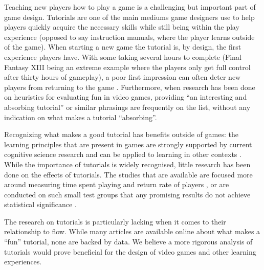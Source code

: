 \documentclass{acmsiggraph}
\begin{document}
Teaching new players how to play a game is a challenging but important part of game design. Tutorials are one of the main mediums game designers use to help players quickly acquire the necessary skills while still being within the play experience (opposed to say instruction manuals, where the player learns outside of the game). 
When starting a new game the tutorial is, by design, the first experience players have. With some taking several hours to complete (Final Fantasy XIII being an extreme example where the players only get full control after thirty hours of gameplay), a poor first impression can often deter new players from returning to the game \cite{useMMO}. Furthermore, when research has been done on heuristics for evaluating fun in video games, providing ``an interesting and absorbing tutorial'' \cite{federoff} or similar phrasings \cite{desurvire} are frequently on the list, without any indication on what makes a tutorial ``absorbing''.

Recognizing what makes a good tutorial has benefits outside of games: the learning principles that are present in games are strongly supported by current cognitive science research and can be applied to learning in other contexts \cite{videolit}.\\
While the importance of tutorials is widely recognised, little research has been done on the effects of tutorials. The studies that are available are focused more around measuring time spent playing and return rate of players \cite{andersen}, or are conducted on such small test groups that any promising results do not achieve statistical significance \cite{hill}. 

The research on tutorials is particularly lacking when it comes to their relationship to flow. While many articles are available online about what makes a ``fun'' tutorial, none are backed by data. We believe a more rigorous analysis of tutorials would prove beneficial for the design of video games and other learning experiences.
\end{document}
